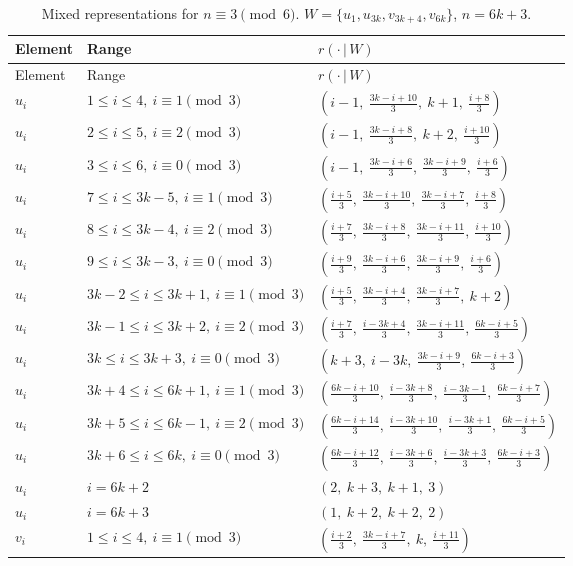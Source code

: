 \clearpage
\begin{longtable}{lll}
\caption{Mixed representations for $n\equiv 3 \pmod 6$. $W=\{u_{1}, u_{3k}, v_{3k+4}, v_{6k}\}$, $n=6k+3$.}\label{tab:W3}\\
\hline Element & Range & $r(\cdot\,|\,W)$ \\ \hline
\endfirsthead
\hline Element & Range & $r(\cdot\,|\,W)$ \\ \hline
\endhead
$u_i$ & $1 \le i \le 4,\ i \equiv 1 \pmod{3}$ & $(i-1,\ \frac{3k-i+10}{3},\ k+1,\ \frac{i+8}{3})$ \\
$u_i$ & $2 \le i \le 5,\ i \equiv 2 \pmod{3}$ & $(i-1,\ \frac{3k-i+8}{3},\ k+2,\ \frac{i+10}{3})$ \\
$u_i$ & $3 \le i \le 6,\ i \equiv 0 \pmod{3}$ & $(i-1,\ \frac{3k-i+6}{3},\ \frac{3k-i+9}{3},\ \frac{i+6}{3})$ \\
$u_i$ & $7 \le i \le 3k-5,\ i \equiv 1 \pmod{3}$ & $(\frac{i+5}{3},\ \frac{3k-i+10}{3},\ \frac{3k-i+7}{3},\ \frac{i+8}{3})$ \\
$u_i$ & $8 \le i \le 3k-4,\ i \equiv 2 \pmod{3}$ & $(\frac{i+7}{3},\ \frac{3k-i+8}{3},\ \frac{3k-i+11}{3},\ \frac{i+10}{3})$ \\
$u_i$ & $9 \le i \le 3k-3,\ i \equiv 0 \pmod{3}$ & $(\frac{i+9}{3},\ \frac{3k-i+6}{3},\ \frac{3k-i+9}{3},\ \frac{i+6}{3})$ \\
$u_i$ & $3k-2 \le i \le 3k+1,\ i \equiv 1 \pmod{3}$ & $(\frac{i+5}{3},\ \frac{3k-i+4}{3},\ \frac{3k-i+7}{3},\ k+2)$ \\
$u_i$ & $3k-1 \le i \le 3k+2,\ i \equiv 2 \pmod{3}$ & $(\frac{i+7}{3},\ \frac{i-3k+4}{3},\ \frac{3k-i+11}{3},\ \frac{6k-i+5}{3})$ \\
$u_i$ & $3k \le i \le 3k+3,\ i \equiv 0 \pmod{3}$ & $(k+3,\ i-3k,\ \frac{3k-i+9}{3},\ \frac{6k-i+3}{3})$ \\
$u_i$ & $3k+4 \le i \le 6k+1,\ i \equiv 1 \pmod{3}$ & $(\frac{6k-i+10}{3},\ \frac{i-3k+8}{3},\ \frac{i-3k-1}{3},\ \frac{6k-i+7}{3})$ \\
$u_i$ & $3k+5 \le i \le 6k-1,\ i \equiv 2 \pmod{3}$ & $(\frac{6k-i+14}{3},\ \frac{i-3k+10}{3},\ \frac{i-3k+1}{3},\ \frac{6k-i+5}{3})$ \\
$u_i$ & $3k+6 \le i \le 6k,\ i \equiv 0 \pmod{3}$ & $(\frac{6k-i+12}{3},\ \frac{i-3k+6}{3},\ \frac{i-3k+3}{3},\ \frac{6k-i+3}{3})$ \\
$u_i$ & $i = 6k+2$ & $(2,\ k+3,\ k+1,\ 3)$ \\
$u_i$ & $i = 6k+3$ & $(1,\ k+2,\ k+2,\ 2)$ \\
$v_i$ & $1 \le i \le 4,\ i \equiv 1 \pmod{3}$ & $(\frac{i+2}{3},\ \frac{3k-i+7}{3},\ k,\ \frac{i+11}{3})$ \\

\end{longtable}
